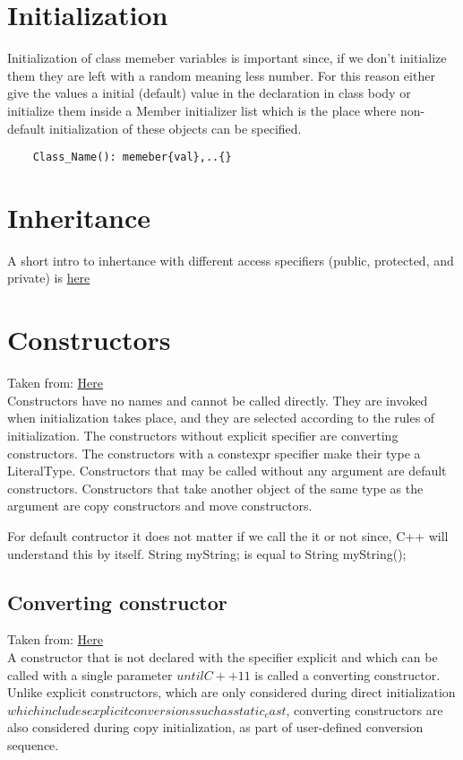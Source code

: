\documentclass[11pt,twoside,a4paper]{report}
\begin{document}
\section{Initialization}
Initialization of class memeber variables is important since, if we don't initialize them they are left with a random meaning less number. For this reason either give the values a initial (default) value in the declaration in class body
or initialize them inside a Member initializer list which is the place where non-default initialization of these objects can be specified.
\begin{lstlisting}
    Class_Name(): memeber{val},..{}
\end{lstlisting}

\section{Inheritance}
A short intro to inhertance with different access specifiers (public, protected, and private) is \href{https://www.tutorialspoint.com/cplusplus/cpp_inheritance.htm}{here}

\section{Constructors}
Taken from: \href{https://en.cppreference.com/w/cpp/language/constructor}{Here} \\
Constructors have no names and cannot be called directly. They are invoked when initialization takes place, and they are selected according to 
the rules of initialization. The constructors without explicit specifier are converting constructors. The constructors with a constexpr specifier 
make their type a LiteralType. Constructors that may be called without any argument are default constructors. Constructors that take another object of the same type as the argument are copy constructors and move constructors. 

For default contructor it does not matter if we call the it or not since, C++ will understand this by itself.
String myString; is equal to String myString();

\subsection{Converting constructor}
Taken from: \href{https://en.cppreference.com/w/cpp/language/converting_constructor}{Here} \\
A constructor that is not declared with the specifier explicit and which can be called with a single parameter \(until C++11\) is called a converting constructor.
Unlike explicit constructors, which are only considered during direct initialization \(which includes explicit conversions such as static_cast\), converting constructors are also considered during copy initialization, as part of user-defined conversion sequence. 
\end{document}
